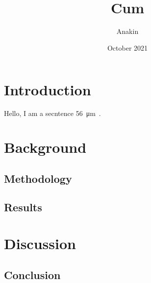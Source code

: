 \documentclass[a4paper,11pt]{report}
\title{Cum}
\author{Anakin}
\date{October 2021}
\begin{document}
\def\spath#1{}
\spath{Title} %

\tableofcontents
\newpage



\chapter{Introduction}
\spath{Intro}


Hello, I am a secntence \SI{56}{\um}~\cite{dirac}.



\newpage
\chapter{Background}
\spath{backgroudn}


\newpage
\section{Methodology}


\newpage
\section{Results}


\newpage
\chapter{Discussion}

\newpage
\section{Conclusion}


\newpage
\printbibliography[title={Bliblyogrpah}]
\end{document}
